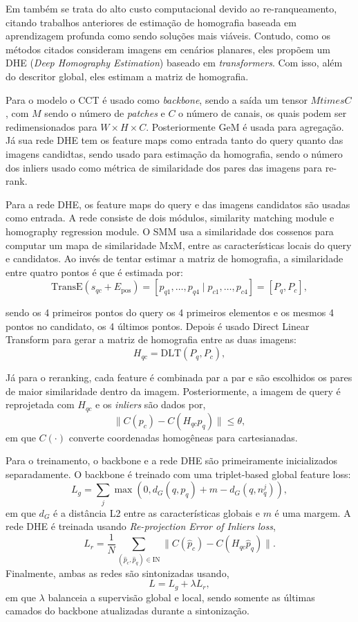 \documentclass[letterpaper, 10 pt, conference]{ieeeconf}  %
\begin{document}
Em \cite{homography} também se trata do alto custo computacional devido ao re-ranqueamento, citando trabalhos anteriores de estimação de homografia baseada em aprendizagem profunda como sendo soluções mais viáveis. Contudo, como os métodos citados consideram imagens em cenários planares, eles propõem um DHE (\textit{Deep Homography Estimation}) baseado em \textit{transformers}. Com isso, além do descritor global, eles estimam a matriz de homografia.

Para o modelo o CCT é usado como \textit{backbone}, sendo a saída um tensor $M times C$, com $M$ sendo o número de \textit{patches} e $C$ o número de canais, os quais podem ser redimensionados para $W \times H \times C$. Posteriormente GeM é usada para agregação. Já sua rede DHE tem os feature maps como entrada tanto do query quanto das imagens candidtas, sendo usado para estimação da homografia, sendo o número dos inliers usado como métrica de similaridade dos pares das imagens para re-rank. 

Para a rede DHE, os feature maps do query e das imagens candidatos são usadas como entrada. A rede consiste de dois módulos, similarity matching module e homography regression module.  O SMM usa a similaridade dos cossenos para computar um mapa de similaridade MxM, entre as características locais do query e candidatos. Ao invés de tentar estimar a matriz de homografia, a similaridade entre quatro pontos é que é estimada por: 
$$
\text{TransE}(s_{qc} + E_{\text{pos}}) = [p_{q1}, \dots, p_{q4} \mid p_{c1}, \dots, p_{c4}] = [P_q, P_c],
$$

sendo os 4 primeiros pontos do query os 4 primeiros elementos e os mesmos 4 pontos no candidato, os 4 últimos pontos. Depois é usado Direct Linear Transform para gerar a matriz de homografia entre as duas imagens: 
$$
H_{qc} = \text{DLT}(P_q, P_c),
$$

Já para o reranking, cada feature é combinada par a par e são escolhidos os pares de maior similaridade dentro da imagem. Posteriormente, a imagem de query é reprojetada com $H_{qc}$ e os \textit{inliers} são dados por,
$$
\|C(p_c) - C(H_{qc} p_q)\| \leq \theta,
$$
em que $C(\cdot)$ converte coordenadas homogêneas para cartesianadas.


Para o treinamento, o backbone e a rede DHE são primeiramente inicializados separadamente. O backbone é treinado com uma triplet-based global feature loss:
$$
L_g = \sum_j \max(0, d_G(q, p_q) + m - d_G(q, n_q^j)),
$$
em que $d_G$ é a distância L2 entre as características globais e $m$ é uma margem. A rede DHE é treinada usando \textit{Re-projection Error of Inliers loss},  
$$
L_r = \frac{1}{N} \sum_{(\hat{p}_c, \hat{p}_q) \in \text{IN}} \|C(\hat{p}_c) - C(H_{qc} \hat{p}_q)\|.
$$
Finalmente, ambas as redes são sintonizadas usando,
$$
L = L_g + \lambda L_r,
$$
em que $\lambda$ balanceia a supervisão global e local, sendo somente as últimas camados do backbone atualizadas durante a sintonização.
\end{document}
